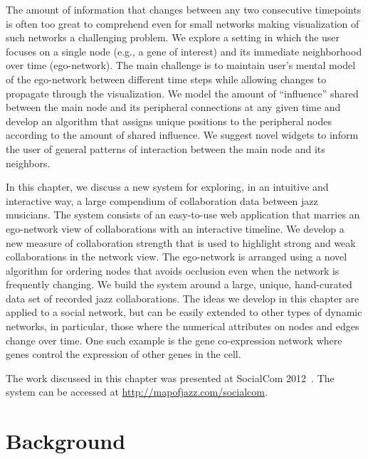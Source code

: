 \documentclass[12pt]{cmuthesis}
\begin{document}
The amount of information that changes between any two consecutive timepoints is often too great to comprehend even for small networks making visualization of such networks a challenging problem. We explore a setting in which the user focuses on a single node (e.g., a gene of interest) and its immediate neighborhood over time (ego-network). The main challenge is to maintain user's mental model of the ego-network between different time steps while allowing changes to propagate through the visualization. We model the amount of ``influence'' shared between the main node and its peripheral connections at any given time and develop an algorithm that assigns unique positions to the peripheral nodes according to the amount of shared influence. We suggest novel widgets to inform the user of general patterns of interaction between the main node and its neighbors.

In this chapter, we discuss a new system for exploring, in an intuitive and interactive way, a large compendium of collaboration data between jazz musicians. The system consists of an easy-to-use web application that marries an ego-network view of collaborations with an interactive timeline.  We develop a new measure of collaboration strength that is used to highlight strong and weak collaborations in the network view. The ego-network is arranged using a novel algorithm for ordering nodes that avoids occlusion even when the network is frequently changing. We build the system around a large, unique, hand-curated data set of recorded jazz collaborations. The ideas we develop in this chapter are applied to a social network, but can be easily extended to other types of dynamic networks, in particular, those where the numerical attributes on nodes and edges change over time. One such example is the gene co-expression network where genes control the expression of other genes in the cell.

The work discussed in this chapter was presented at SocialCom 2012~\cite{Filippova2012moj}. The system can be accessed at \url{http://mapofjazz.com/socialcom}.

\section{Background}
\end{document}
